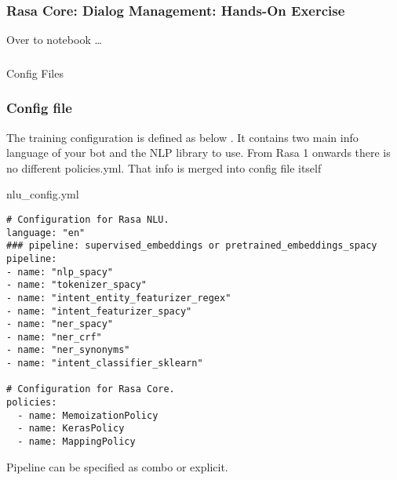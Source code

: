 \begin{frame}[fragile]\frametitle{Rasa Core: Dialog Management: Hands-On Exercise}
\begin{center}

{\Large Over to notebook \ldots}

\end{center}
\end{frame}



\begin{frame}[fragile]\frametitle{}
\begin{center}
{\Large Config Files}

\end{center}
\end{frame}

 \begin{frame}[fragile]\frametitle{Config file}
 
 The training configuration is defined as below . It contains two main info language of your bot and the NLP library to use.
 From Rasa 1 onwards there is no different policies.yml. That info is merged into config file itself
 
nlu\_config.yml


\begin{lstlisting}
# Configuration for Rasa NLU.
language: "en"
### pipeline: supervised_embeddings or pretrained_embeddings_spacy
pipeline:
- name: "nlp_spacy"
- name: "tokenizer_spacy"
- name: "intent_entity_featurizer_regex"
- name: "intent_featurizer_spacy"
- name: "ner_spacy"
- name: "ner_crf"
- name: "ner_synonyms"
- name: "intent_classifier_sklearn"

# Configuration for Rasa Core.
policies:
  - name: MemoizationPolicy
  - name: KerasPolicy
  - name: MappingPolicy
\end{lstlisting}

Pipeline can be specified as combo or explicit.
\end{frame}

